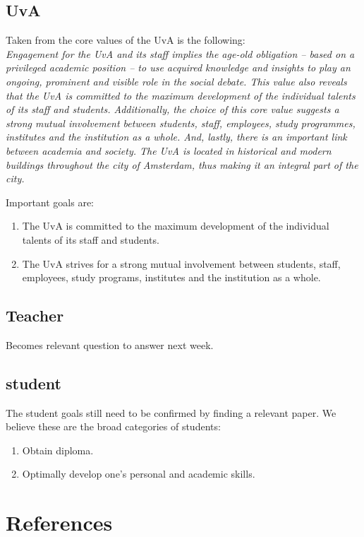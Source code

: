 \section{UvA}
Taken from the core values of the UvA is the following: \\
\textit{Engagement for the UvA and its staff implies the age-old obligation – based on a privileged academic position – to use acquired knowledge and insights to play an ongoing, prominent and visible role in the social debate. This value also reveals that the UvA is committed to the maximum development of the individual talents of its staff and students. Additionally, the choice of this core value suggests a strong mutual involvement between students, staff, employees, study programmes, institutes and the institution as a whole. And, lastly, there is an important link between academia and society. The UvA is located in historical and modern buildings throughout the city of Amsterdam, thus making it an integral part of the city.}

Important goals are:
\begin{enumerate}
	\item The UvA is committed to the maximum development of the individual talents of its staff and students.
	\item The UvA strives for a strong mutual involvement between students, staff, employees, study programs, institutes and the institution as a whole.
\end{enumerate}

\section{Teacher}
Becomes relevant question to answer next week.

\section{student}
The student goals still need to be confirmed by finding a relevant paper. We believe these are the broad categories of students:
\begin{enumerate}
	\item Obtain diploma.
	\item Optimally develop one's personal and academic skills.
\end{enumerate}

\chapter{References}

